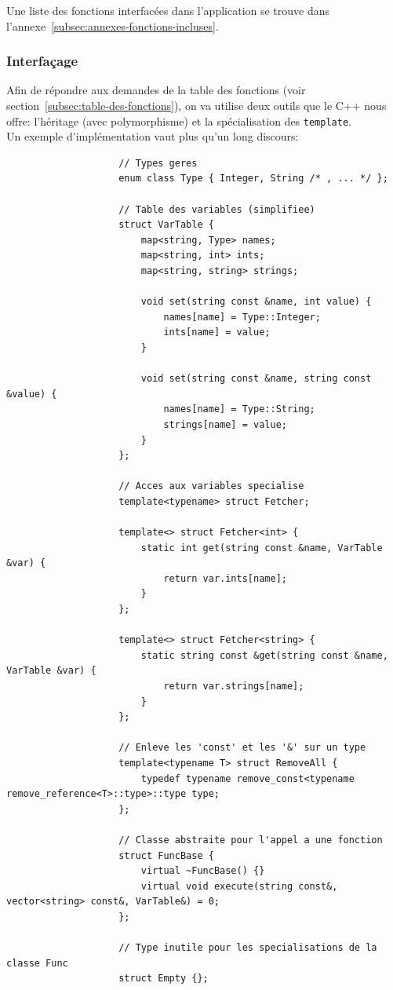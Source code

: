 \documentclass[french]{article}
\begin{document}
		Une liste des fonctions interfacées dans l'application se trouve dans l'annexe~\ref{subsec:annexes-fonctions-incluses}. 
		
		\subsubsection{Interfaçage}
		\label{subsubsec:interfacage}
		Afin de répondre aux demandes de la table des fonctions (voir section~\ref{subsec:table-des-fonctions}), on va utilise deux outils que le C++ nous offre: l'héritage (avec polymorphisme) et la spécialisation des \texttt{template}.\\
		
		Un exemple d'implémentation vaut plus qu'un long discours:
		
		\begin{lstlisting}
					// Types geres
					enum class Type { Integer, String /* , ... */ };
					
					// Table des variables (simplifiee)
					struct VarTable {
						map<string, Type> names;
						map<string, int> ints;
						map<string, string> strings;
						
						void set(string const &name, int value) {
							names[name] = Type::Integer;
							ints[name] = value;
						}
						
						void set(string const &name, string const &value) {
							names[name] = Type::String;
							strings[name] = value;
						}
					};
					
					// Acces aux variables specialise
					template<typename> struct Fetcher;
					
					template<> struct Fetcher<int> {
						static int get(string const &name, VarTable &var) {
							return var.ints[name];
						}
					};
					
					template<> struct Fetcher<string> {
						static string const &get(string const &name, VarTable &var) {
							return var.strings[name];
						}
					};
					
					// Enleve les 'const' et les '&' sur un type
					template<typename T> struct RemoveAll {
						typedef typename remove_const<typename remove_reference<T>::type>::type type;
					};
					
					// Classe abstraite pour l'appel a une fonction
					struct FuncBase {
						virtual ~FuncBase() {}
						virtual void execute(string const&, vector<string> const&, VarTable&) = 0;
					};
					
					// Type inutile pour les specialisations de la classe Func
					struct Empty {};
					

\end{lstlisting}
\end{document}
